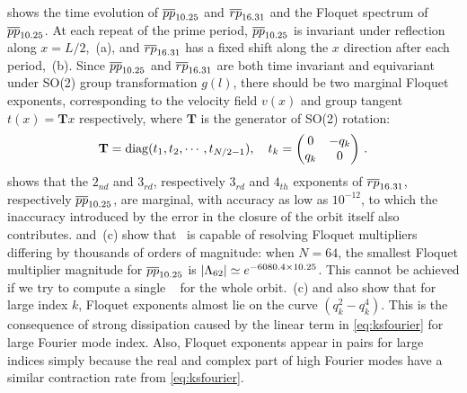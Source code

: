 \documentclass[final,leqno,onefignum,onetabnum]{siamltexmm}
\begin{document}
 shows the time evolution of ${\overline{pp}}_{10.25}$
and ${\overline{rp}}_{16.31}$ and the Floquet spectrum of ${\overline{pp}}_{10.25}$.
At each repeat of the prime period, ${\overline{pp}}_{10.25}$ is invariant
under reflection along $x=L/2$, \,(a), and
${\overline{rp}}_{16.31}$ has a {fixed shift along the $x$ direction
after each period},
\,(b). Since ${\overline{pp}}_{10.25}$ and
${\overline{rp}}_{16.31}$ are both
time invariant and equivariant under SO(2) group transformation $g(l)$,
there should be two marginal Floquet exponents, corresponding to the
velocity field $v(x)$ and group tangent $t(x)=\mathbf{T}x$ respectively,
where $\mathbf{T}$ is the generator of SO(2) rotation:
\[
\mathbf{T}=\diag(t_{1},t_{2},\cdots,t_{N/2-1}),\quad
t_{k}=
\begin{pmatrix}
  0 & -q_{k} \\
  q_{k} & 0
\end{pmatrix}
\,.
\]
 shows that the $2_{nd}$ and $3_{rd}$,
respectively $3_{rd}$ and $4_{th}$ exponents of ${\overline{rp}}_{16.31}$,
respectively ${\overline{pp}}_{10.25}$, are marginal, with accuracy as low as
$10^{-12}$, to which the inaccuracy introduced by the error in the closure of
the orbit itself also contributes.  and
\,(c) show that \psd\ is capable of resolving
Floquet multipliers differing by thousands of orders {of magnitude}:
when $N=64$, the smallest Floquet multiplier {magnitude }
for ${\overline{pp}}_{10.25}$ is
$|\Lambda_{62}| \simeq e^{-6080.4\times 10.25}$.
{This cannot be achieved if we try to compute a single
\JacobianM\ } for the whole orbit.
\,(c) and  also
show that for {large index} $k$, Floquet exponents almost lie on the
curve $(q_k^2 - q_k^4 )$. This is the consequence of
strong dissipation caused by the linear term in \eqref{eq:ksfourier} for
large Fourier mode index.
Also, Floquet exponents appear in pairs for large indices simply because
the real and complex part of high Fourier modes have a similar contraction
rate from \eqref{eq:ksfourier}.
\end{document}
